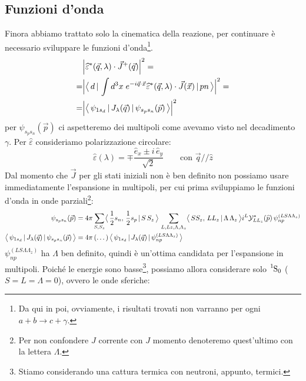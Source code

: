 \subsection{Funzioni d'onda} Finora abbiamo trattato solo la cinematica della reazione, per continuare è necessario sviluppare le funzioni d'onda\footnote{Da qui in poi, ovviamente, i risultati trovati non varranno per ogni $a+b\to c +\gamma$.}.
\begin{displaymath}
\begin{aligned}
&\Bigl|\widehat{\varepsilon}^*(\vec{q},\lambda) \cdot \vec{J}^+(\vec{q})\Bigr|^2 = \\
=& \Bigl|\bigl\langle\, d\, |\,\int d^3x \; e^{-i\vec{q}\cdot\vec{x}}\widehat{\varepsilon}^*(\vec{q},\lambda) \cdot \vec{J}(\vec{x})\, |\,pn\, \bigr\rangle\Bigr|^2 =\\
=& \Bigl | \bigl\langle\, \psi_{1s_d}\, |\,J_\lambda(\vec{q})\, |\,\psi_{s_p s_n}(\vec{p})\, \bigr\rangle \Bigr |^2
\end{aligned}
\end{displaymath}
per $\psi_{s_p s_n}(\vec{p})$ ci aspetteremo dei multipoli come avevamo visto nel decadimento $\gamma$. Per $\widehat{\varepsilon}$ consideriamo polarizzazione circolare:
$$\widehat{\varepsilon}(\lambda) = \mp \frac{\widehat{e}_x \pm i\,\widehat{e}_y}{\sqrt{2}}\qquad \text{con } \vec{q} // \hat{z} $$
Dal momento che $\vec{J}$ per gli stati iniziali non è ben definito non possiamo usare immediatamente l'espansione in multipoli, per cui prima sviluppiamo le funzioni d'onda in onde parziali\footnote{Per non confondere $J$ corrente con $J$ momento denoteremo quest'ultimo con la lettera $\Lambda$.}:
\begin{displaymath}
\begin{aligned}
\psi_{s_ps_n}(\vec{p}) &= 4\pi \sum_{S,S_z} \clebs{\frac{1}{2}s_n,\,\frac{1}{2}s_p}{S\,S_z}\, \sum_{L,Lz,\Lambda,\Lambda_z} \clebs{SS_z,\,LL_z}{\Lambda\,\Lambda_z} i^L \mathcal{Y}^*_{LL_z}(\widehat{p}) \, \psi_{np}^{(LS\Lambda\Lambda_z)} \\
%
\oss{\psi_{1s_d}}{J_\lambda(\vec{q})}{\psi_{s_p s_n}(\vec{p})} &= 4\pi \,(\dots)\, \oss{\psi_{1s_d}}{J_\lambda(\vec{q})}{\psi_{np}^{(LS\Lambda\Lambda_z)}}
\end{aligned}
\end{displaymath}
$\psi_{np}^{(LS\Lambda\Lambda_z)}$ ha $\Lambda$ ben definito, quindi è un'ottima candidata per l'espansione in multipoli. Poiché le energie sono basse\footnote{Stiamo considerando una cattura termica con neutroni, appunto, termici.}, possiamo allora considerare solo $\ce{^1S_0}$ ($S=L=\Lambda = 0$), ovvero le onde sferiche:
